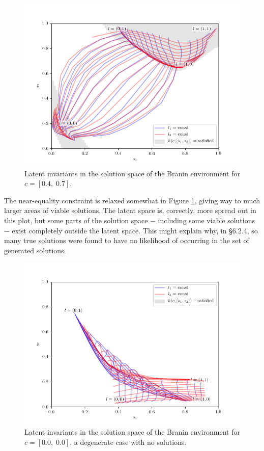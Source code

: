 \documentclass[../../main.tex]{subfiles}
\begin{document}
\begin{figure}[H]
    \begin{center}
    \includegraphics[width=\textwidth]{latentPlot0407}
    \caption{
        Latent invariants in the solution space of the Branin environment for $c=[0.4,\;0.7]$.
    }
    \label{fig:latentPlot0407}
    \end{center}
\end{figure}
The near-equality constraint is relaxed somewhat in Figure \ref{fig:latentPlot0407}, giving way to much larger areas of viable solutions.
The latent space is, correctly, more spread out in this plot, but some parts of the solution space $-$ including some viable solutions $-$ exist completely outside the latent space.
This might explain why, in \S6.2.4, so many true solutions were found to have no likelihood of occurring in the set of generated solutions.
\begin{figure}[H]
    \begin{center}
    \includegraphics[width=\textwidth]{latentPlot0000}
    \caption{
        Latent invariants in the solution space of the Branin environment for $c=[0.0,\;0.0]$, a degenerate case with no solutions.
    }
    \label{fig:latentPlot0000}
    \end{center}
\end{figure}
\end{document}
